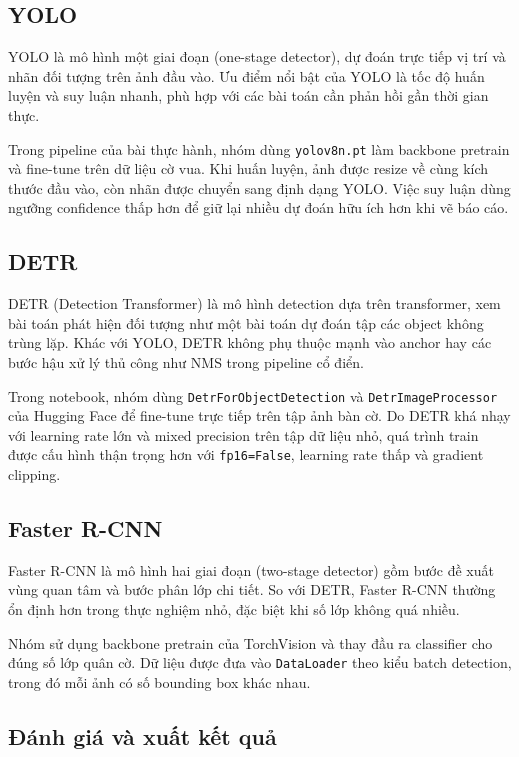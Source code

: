 \documentclass[12pt,a4paper]{article}
\begin{document}
\subsection{YOLO}

YOLO là mô hình một giai đoạn (one-stage detector), dự đoán trực tiếp vị trí và nhãn đối tượng trên ảnh đầu vào. Ưu điểm nổi bật của YOLO là tốc độ huấn luyện và suy luận nhanh, phù hợp với các bài toán cần phản hồi gần thời gian thực.

Trong pipeline của bài thực hành, nhóm dùng \texttt{yolov8n.pt} làm backbone pretrain và fine-tune trên dữ liệu cờ vua. Khi huấn luyện, ảnh được resize về cùng kích thước đầu vào, còn nhãn được chuyển sang định dạng YOLO. Việc suy luận dùng ngưỡng confidence thấp hơn để giữ lại nhiều dự đoán hữu ích hơn khi vẽ báo cáo.

\subsection{DETR}

DETR (Detection Transformer) là mô hình detection dựa trên transformer, xem bài toán phát hiện đối tượng như một bài toán dự đoán tập các object không trùng lặp. Khác với YOLO, DETR không phụ thuộc mạnh vào anchor hay các bước hậu xử lý thủ công như NMS trong pipeline cổ điển.

Trong notebook, nhóm dùng \texttt{DetrForObjectDetection} và \texttt{DetrImageProcessor} của Hugging Face để fine-tune trực tiếp trên tập ảnh bàn cờ. Do DETR khá nhạy với learning rate lớn và mixed precision trên tập dữ liệu nhỏ, quá trình train được cấu hình thận trọng hơn với \texttt{fp16=False}, learning rate thấp và gradient clipping.

\subsection{Faster R-CNN}

Faster R-CNN là mô hình hai giai đoạn (two-stage detector) gồm bước đề xuất vùng quan tâm và bước phân lớp chi tiết. So với DETR, Faster R-CNN thường ổn định hơn trong thực nghiệm nhỏ, đặc biệt khi số lớp không quá nhiều.

Nhóm sử dụng backbone pretrain của TorchVision và thay đầu ra classifier cho đúng số lớp quân cờ. Dữ liệu được đưa vào \texttt{DataLoader} theo kiểu batch detection, trong đó mỗi ảnh có số bounding box khác nhau.

\subsection{Đánh giá và xuất kết quả}
\end{document}
